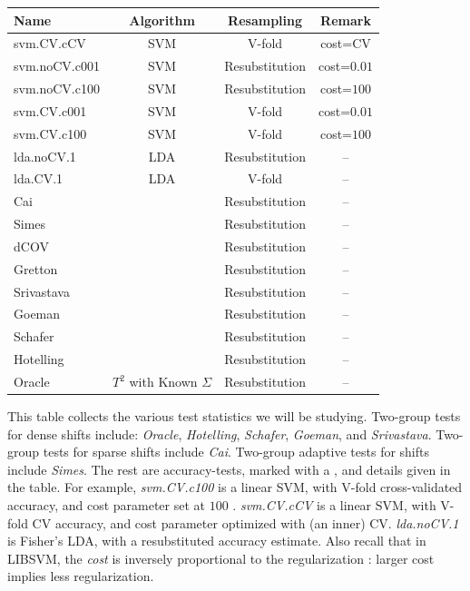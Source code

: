\documentclass[]{bio}
\begin{document}
\begin{tcolorbox}
	\centering
	\footnotesize
	\begin{tabular}{l|c|c|c}
		Name & Algorithm & Resampling & Remark\\ 
		\hline
		\hline
		\cue svm.CV.cCV 	& SVM & V-fold  & cost=CV \\ 
		\cue svm.noCV.c001 	& SVM & Resubstitution  & cost=$0.01$ \\ 
		\cue svm.noCV.c100 	& SVM & Resubstitution  & cost=$100$ \\ 
		\cue svm.CV.c001	& SVM & V-fold 		    & cost=$0.01$ \\ 
		\cue svm.CV.c100	& SVM & V-fold 		    & cost=$100$ \\ 
		\cue lda.noCV.1 	& LDA & Resubstitution 	&  --\\ 
		\cue lda.CV.1 	& LDA & V-fold 			&  -- \\ 
		Cai & \cite{cai_two-sample_2013} & Resubstitution & -- \\ 
		Simes & \cite{simes1986improved} & Resubstitution & -- \\ 
		dCOV & \cite{szekely2004testing} & Resubstitution & -- \\ 
		Gretton & \cite{gretton_kernel_2012-1} & Resubstitution & -- \\ 
		Srivastava & \cite{srivastava_test_2008} & Resubstitution & -- \\ 
		Goeman & \cite{goeman2006testing} & Resubstitution & -- \\ 
		Schafer & \cite{schafer_shrinkage_2005} & Resubstitution & -- \\ 
		Hotelling & \cite{hotelling_generalization_1931} & Resubstitution & -- \\
		Oracle & $T^2$ with Known $\Sigma$ & Resubstitution & -- \\ 
	\end{tabular} 
	\captionsetup{type=table}
	\caption{\footnotesize
		This table collects the various test statistics we will be studying. 
		Two-group tests for dense shifts include: \textit{Oracle}, \textit{Hotelling}, \textit{Schafer}, \textit{Goeman}, and \textit{Srivastava}.
		Two-group tests for sparse shifts include \textit{Cai}.
		Two-group adaptive tests for shifts include \textit{Simes}.
		The rest are accuracy-tests, marked with a \cue, and details given in the table. 	
		For example, \textit{svm.CV.c100} is a linear SVM, with V-fold cross-validated accuracy, and cost parameter set at $100$ \citep{meyer_e1071:_2015}.
		\textit{svm.CV.cCV} is a linear SVM, with V-fold CV accuracy, and cost parameter optimized with (an inner) CV. 
		\textit{lda.noCV.1} is Fisher's LDA, with a resubstituted accuracy estimate.
		Also recall that in LIBSVM, the \emph{cost} is inversely proportional to the regularization \citep{chang2011libsvm}: larger cost implies less regularization. 
	}
	\label{tab:collected}
\end{tcolorbox}
\end{document}
